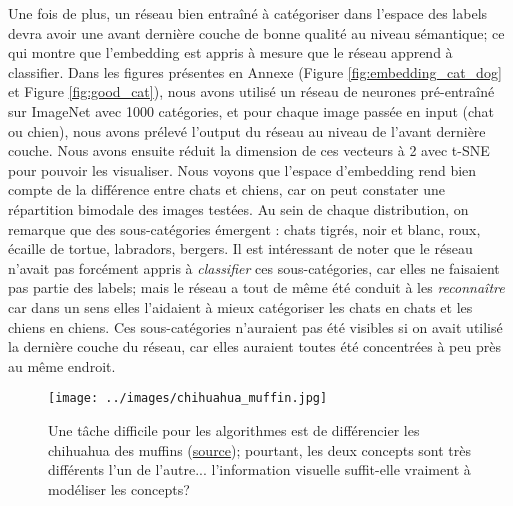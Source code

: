 \documentclass[french]{article}
\begin{document}
				Une fois de plus, un réseau bien entraîné à catégoriser dans l'espace des labels devra avoir une avant dernière couche de bonne qualité au niveau sémantique; ce qui montre que l'embedding est appris à mesure que le réseau apprend à classifier. Dans les figures présentes en Annexe (Figure \ref{fig:embedding_cat_dog} et Figure \ref{fig:good_cat}), nous avons utilisé un réseau de neurones pré-entraîné sur ImageNet avec 1000 catégories, et pour chaque image passée en input (chat ou chien), nous avons prélevé l'output du réseau au niveau de l'avant dernière couche. Nous avons ensuite réduit la dimension de ces vecteurs à 2 avec t-SNE pour pouvoir les visualiser. Nous voyons que l'espace d'embedding rend bien compte de la différence entre chats et chiens, car on peut constater une répartition bimodale des images testées. Au sein de chaque distribution, on remarque que des sous-catégories émergent : chats tigrés, noir et blanc, roux, écaille de tortue, labradors, bergers. Il est intéressant de noter que le réseau n'avait pas forcément appris à \textit{classifier} ces sous-catégories, car elles ne faisaient pas partie des labels; mais le réseau a tout de même été conduit à les \textit{reconnaître} car dans un sens elles l'aidaient à mieux catégoriser les chats en chats et les chiens en chiens. Ces sous-catégories n'auraient pas été visibles si on avait utilisé la dernière couche du réseau, car elles auraient toutes été concentrées à peu près au même endroit.
				\begin{figure}[H]
					\centering
					\texttt{[image: ../images/chihuahua\_muffin.jpg]}
					\caption{Une tâche difficile pour les algorithmes est de différencier les chihuahua des muffins (\href{https://medium.freecodecamp.org/chihuahua-or-muffin-my-search-for-the-best-computer-vision-api-cbda4d6b425d}{source}); pourtant, les deux concepts sont très différents l'un de l'autre... l'information visuelle suffit-elle vraiment à modéliser les concepts?}
				\end{figure}
\end{document}
